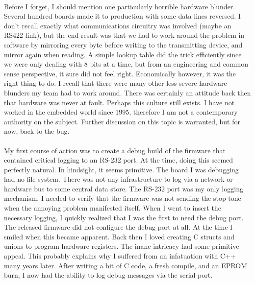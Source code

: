 \paragraph {}
Before I forget, I should mention one particularly horrible hardware blunder.
Several hundred boards made it to production with some data lines reversed. I
don't recall exactly what communications circuitry was involved (maybe an RS422
link), but the end result was that we had to work around the problem in software
by mirroring every byte before writing to the transmitting device, and mirror
again when reading. A simple lookup table did the trick efficiently since we
were only dealing with 8 bits at a time, but from an engineering and common
sense perspective, it sure did not feel right. Economically however, it was the
right thing to do. I recall that there were many other less severe hardware
blunders my team had to work around. There was certainly an attitude back then
that hardware was never at fault. Perhaps this culture still exists. I have not
worked in the embedded world since 1995, therefore I am not a contemporary
authority on the subject. Further discussion on this topic is warranted, but for
now, back to the bug.
\paragraph {}
My first course of action was to create a debug build of the firmware that
contained critical logging to an RS-232 port. At the time, doing this seemed
perfectly natural. In hindsight, it seems primitive. The board I was debugging
had no file system. There was not any infrastructure to log via a network or
hardware bus to some central data store. The RS-232 port was my only logging
mechanism. I needed to verify that the firmware was not sending the stop tone
when the annoying problem manifested itself. When I went to insert the necessary
logging, I quickly realized that I was the first to need the debug port. The
released firmware did not configure the debug port at all. At the time I smiled
when this became apparent. Back then I loved creating C structs and unions to
program hardware registers. The inane intricacy had some primitive appeal. This
probably explains why I suffered from an infatuation with C++ many years later.
After writing a bit of C code, a fresh compile, and an EPROM burn, I now had the
ability to log debug messages via the serial port.
